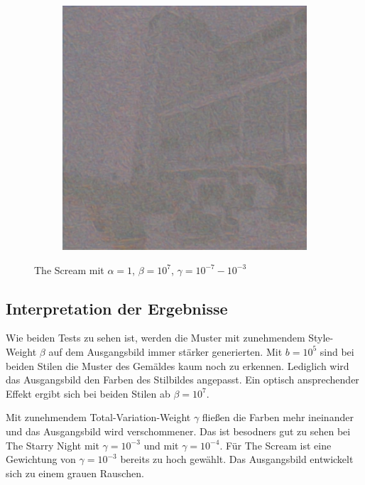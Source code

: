 \begin{figure}[H]
\begin{subfigure}[h]{0.15\textwidth}
    \end{subfigure}
    \begin{subfigure}[h]{0.15\textwidth}
        \centering
        \includegraphics[width=\textwidth]{resources/content/experiments/b__the_scream__768x768__style-weight_1e+07__tv-weight_1e-03.jpg}
    \end{subfigure}
    \caption{The Scream mit $ \alpha = 1 $, $ \beta = 10^{7} $, $ \gamma = 10^{-7} - 10^{-3} $}
\end{figure}

\pagebreak

\subsection{Interpretation der Ergebnisse}

Wie beiden Tests zu sehen ist, werden die Muster mit zunehmendem Style-Weight $ \beta $ auf dem Ausgangsbild immer stärker generierten. Mit $ b = 10^{5} $ sind bei beiden Stilen die Muster des Gemäldes kaum noch zu erkennen. Lediglich wird das Ausgangsbild den Farben des Stilbildes angepasst. Ein optisch ansprechender Effekt ergibt sich bei beiden Stilen ab $ \beta = 10^{7} $. 

Mit zunehmendem Total-Variation-Weight $ \gamma $ fließen die Farben mehr ineinander und das Ausgangsbild wird verschommener. Das ist besodners gut zu sehen bei The Starry Night mit $ \gamma = 10^{-3} $ und  mit $ \gamma = 10^{-4} $. Für The Scream ist eine Gewichtung von $ \gamma = 10^{-3} $ bereits zu hoch gewählt. Das Ausgangsbild entwickelt sich zu einem grauen Rauschen.


